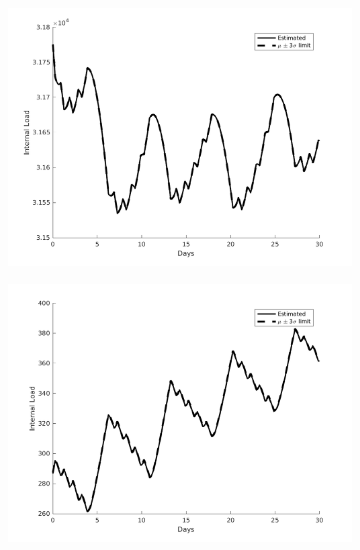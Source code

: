 \begin{figure}[H]
\begin{subfigure}{0.45\textwidth}
\centering
\includegraphics[width=\textwidth]{jbs_figures/load_1_6}
\caption{}
\label{load_1_6}
\end{subfigure}
\centering
\begin{subfigure}{0.45\textwidth}
\includegraphics[width=\textwidth]{jbs_figures/load_2_6}
\caption{}
\label{load_2_6}
\end{subfigure} \\
\begin{subfigure}{0.45\textwidth}
\centering

\end{subfigure}
\end{figure}
